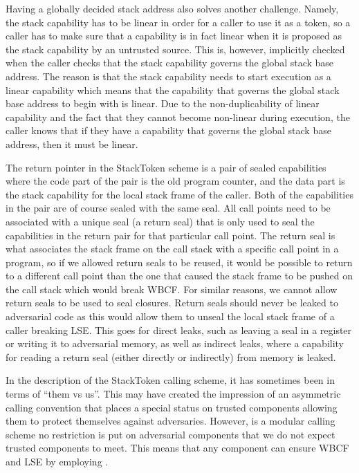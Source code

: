 \documentclass[acmsmall,review,anonymous]{acmart}\settopmatter{printfolios=true,printccs=false,printacmref=false}
\begin{document}
Having a globally decided stack address also solves another challenge.
Namely, the stack capability has to be linear in order for a caller to use it as a token, so a caller has to make sure that a capability is in fact linear when it is proposed as the stack capability by an untrusted source.
This is, however, implicitly checked when the caller checks that the stack capability governs the global stack base address.
The reason is that the stack capability needs to start execution as a linear capability which means that the capability that governs the global stack base address to begin with is linear.
Due to the non-duplicability of linear capability and the fact that they cannot become non-linear during execution, the caller knows that if they have a capability that governs the global stack base address, then it must be linear.

The return pointer in the StackToken scheme is a pair of sealed capabilities where the code part of the pair is the old program counter, and the data part is the stack capability for the local stack frame of the caller.
Both of the capabilities in the pair are of course sealed with the same seal.
All call points need to be associated with a unique seal (a return seal) that is only used to seal the capabilities in the return pair for that particular call point.
The return seal is what associates the stack frame on the call stack with a specific call point in a program, so if we allowed return seals to be reused, it would be possible to return to a different call point than the one that caused the stack frame to be pushed on the call stack which would break WBCF.
For similar reasons, we cannot allow return seals to be used to seal closures.
Return seals should never be leaked to adversarial code as this would allow them to unseal the local stack frame of a caller breaking LSE.
This goes for direct leaks, such as leaving a seal in a register or writing it to adversarial memory, as well as indirect leaks, where a capability for reading a return seal (either directly or indirectly) from memory is leaked.

In the description of the StackToken calling scheme, it has sometimes been in terms of ``them vs us''.
This may have created the impression of an asymmetric calling convention that places a special status on trusted components allowing them to protect themselves against adversaries.
However, \stktokens{} is a modular calling scheme no restriction is put on adversarial components that we do not expect trusted components to meet.
This means that any component can ensure WBCF and LSE by employing \stktokens{}.
\end{document}
